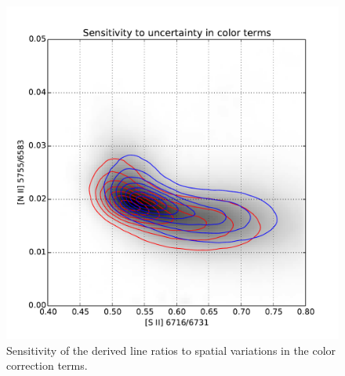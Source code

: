 \documentclass[preprint]{aastex}
\begin{document}
\begin{figure}
  \centering
  \includegraphics[width=\linewidth]{ratio-sensitivity-ktwiddle}
  \caption{Sensitivity of the derived line ratios to spatial
    variations in the color correction terms.}
  \label{fig:sens-ktwid}
\end{figure}
\end{document}
